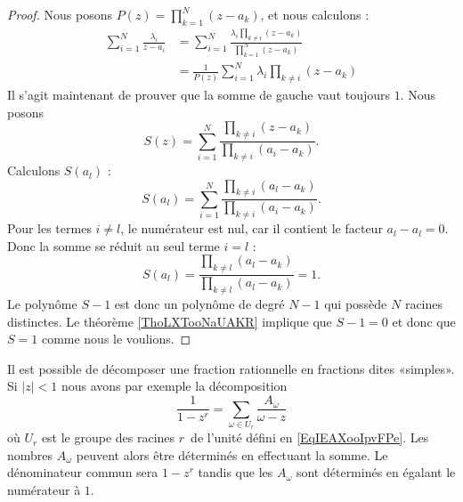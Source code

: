 \begin{proof}
	Nous posons \( P(z)=\prod_{k=1}^N(z-a_k)\), et nous calculons :
	\begin{subequations}
		\begin{align}
			\sum_{i=1}^N\frac{ \lambda_i }{ z-a_i } & =  \sum_{i=1}^N\frac{ \lambda_i\prod_{k\neq i}(z-a_k) }{ \prod_{k=1}^N(z-a_k) } \\
			                                        & =  \frac{1}{ P(z) }\sum_{i=1}^N\lambda_i\prod_{k\neq i}(z-a_k)
		\end{align}
	\end{subequations}
	Il s'agit maintenant de prouver que la somme de gauche vaut toujours \( 1\). Nous posons
	\begin{equation}
		S(z)=\sum_{i=1}^N\frac{ \prod_{k\neq i}(z-a_k) }{ \prod_{k\neq i}(a_i-a_k) }.
	\end{equation}
	Calculons \( S(a_l)\) :
	\begin{equation}
		S(a_l)=\sum_{i=1}^N\frac{ \prod_{k\neq i}(a_l-a_k) }{ \prod_{k\neq i}(a_i-a_k) }.
	\end{equation}
	Pour les termes \( i\neq l\), le numérateur est nul, car il contient le facteur \( a_l-a_l=0\). Donc la somme se réduit au seul terme \( i=l\) :
	\begin{equation}
		S(a_l)=\frac{ \prod_{k\neq l}(a_l-a_k) }{ \prod_{k\neq l}(a_l-a_k) }=1.
	\end{equation}
	Le polynôme \( S-1\) est donc un polynôme de degré \( N-1\) qui possède \( N\) racines distinctes. Le théorème \ref{ThoLXTooNaUAKR} implique que \( S-1=0\) et donc que \( S=1\) comme nous le voulions.
\end{proof}

Il est possible de décomposer une fraction rationnelle en fractions dites «simples». Si \( | z |<1\) nous avons par exemple la décomposition
\begin{equation}        \label{EqDWYBooJIMBAt}
	\frac{1}{ 1-z^r }=\sum_{\omega\in U_r}\frac{ A_{\omega} }{ \omega-z }
\end{equation}
où \( U_r\) est le groupe des racines \( r\)\ieme\ de l'unité défini en \eqref{EqIEAXooIpvFPe}. Les nombres \( A_{\omega}\) peuvent alors être déterminés en effectuant la somme. Le dénominateur commun sera \( 1-z^r\) tandis que les \( A_{\omega}\) sont déterminés en égalant le numérateur à \( 1\).

